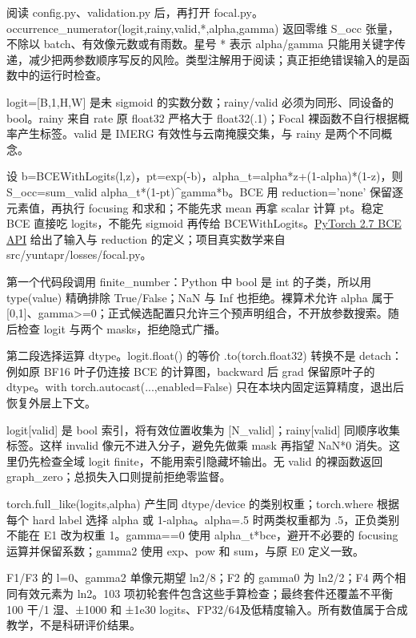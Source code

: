 \documentclass[UTF8,fontset=fandol,10pt]{ctexart}
\begin{document}
阅读 config.py、validation.py 后，再打开 focal.py。occurrence\_\allowbreak{}numerator(logit,rainy,valid,*,alpha,gamma) 返回零维 S\_\allowbreak{}occ 张量，不除以 batch、有效像元数或有雨数。星号 * 表示 alpha/\allowbreak{}gamma 只能用关键字传递，减少把两参数顺序写反的风险。类型注解用于阅读；真正拒绝错误输入的是函数中的运行时检查。

logit=[B,1,H,W] 是未 sigmoid 的实数分数；rainy/\allowbreak{}valid 必须为同形、同设备的 bool。rainy 来自 rate 原 float32 严格大于 float32(.1)；Focal 裸函数不自行根据概率产生标签。valid 是 IMERG 有效性与云南掩膜交集，与 rainy 是两个不同概念。

设 b=BCEWithLogits(l,z)，pt=exp(-b)，alpha\_\allowbreak{}t=alpha*z+(1-alpha)*(1-z)，则 S\_\allowbreak{}occ=sum\_\allowbreak{}valid alpha\_\allowbreak{}t*(1-pt)\textasciicircum{}gamma*b。BCE 用 reduction='none' 保留逐元素值，再执行 focusing 和求和；不能先求 mean 再拿 scalar 计算 pt。稳定 BCE 直接吃 logits，不能先 sigmoid 再传给 BCEWithLogits。\href{https://docs.pytorch.org/docs/2.7/generated/torch.nn.functional.binary_cross_entropy_with_logits.html}{PyTorch 2.7 BCE API} 给出了输入与 reduction 的定义；项目真实数学来自 src/\allowbreak{}yuntapr/\allowbreak{}losses/\allowbreak{}focal.py。

第一个代码段调用 finite\_\allowbreak{}number：Python 中 bool 是 int 的子类，所以用 type(value) 精确排除 True/\allowbreak{}False；NaN 与 Inf 也拒绝。裸算术允许 alpha 属于 [0,1]、gamma>=0；正式候选配置只允许三个预声明组合，不开放参数搜索。随后检查 logit 与两个 masks，拒绝隐式广播。

第二段选择运算 dtype。logit.float() 的等价 .to(torch.float32) 转换不是 detach：例如原 BF16 叶子仍连接 BCE 的计算图，backward 后 grad 保留原叶子的 dtype。with torch.autocast(...,enabled=False) 只在本块内固定运算精度，退出后恢复外层上下文。

logit[valid] 是 bool 索引，将有效位置收集为 [N\_\allowbreak{}valid]；rainy[valid] 同顺序收集标签。这样 invalid 像元不进入分子，避免先做乘 mask 再指望 NaN*0 消失。这里仍先检查全域 logit finite，不能用索引隐藏坏输出。无 valid 的裸函数返回 graph\_\allowbreak{}zero；总损失入口则提前拒绝零监督。

torch.full\_\allowbreak{}like(logits,alpha) 产生同 dtype/\allowbreak{}device 的类别权重；torch.where 根据每个 hard label 选择 alpha 或 1-alpha。alpha=.5 时两类权重都为 .5，正负类别不能在 E1 改为权重 1。gamma==0 使用 alpha\_\allowbreak{}t*bce，避开不必要的 focusing 运算并保留系数；gamma2 使用 exp、pow 和 sum，与原 E0 定义一致。

F1/\allowbreak{}F3 的 l=0、gamma2 单像元期望 ln2/\allowbreak{}8；F2 的 gamma0 为 ln2/\allowbreak{}2；F4 两个相同有效元素为 ln2。103 项初轮套件包含这些手算检查；最终套件还覆盖不平衡 100 干/\allowbreak{}1 湿、±1000 和 ±1e30 logits、FP32/\allowbreak{}64及低精度输入。所有数值属于合成教学，不是科研评价结果。
\end{document}
